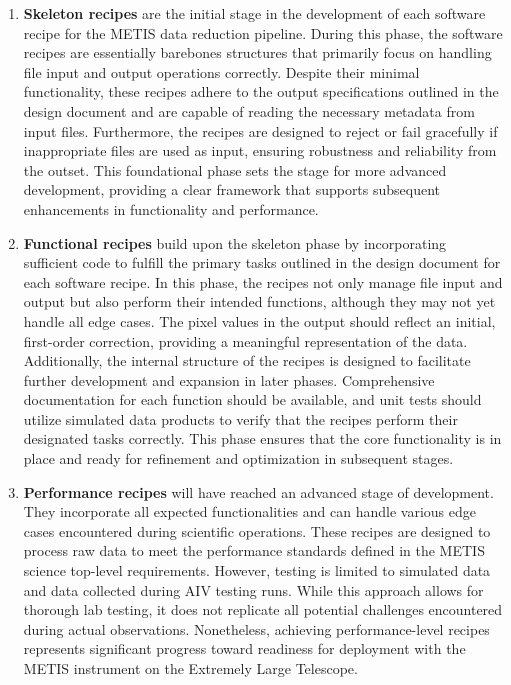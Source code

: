 \documentclass[a4paper]{spie}  %
\begin{document}
 \begin{enumerate}
     \item \textbf{Skeleton recipes }are the initial stage in the development of each software recipe for the METIS data reduction pipeline. During this phase, the software recipes are essentially barebones structures that primarily focus on handling file input and output operations correctly. Despite their minimal functionality, these recipes adhere to the output specifications outlined in the design document and are capable of reading the necessary metadata from input files. Furthermore, the recipes are designed to reject or fail gracefully if inappropriate files are used as input, ensuring robustness and reliability from the outset. This foundational phase sets the stage for more advanced development, providing a clear framework that supports subsequent enhancements in functionality and performance.
 
     \item \textbf{Functional recipes} build upon the skeleton phase by incorporating sufficient code to fulfill the primary tasks outlined in the design document for each software recipe. In this phase, the recipes not only manage file input and output but also perform their intended functions, although they may not yet handle all edge cases. The pixel values in the output should reflect an initial, first-order correction, providing a meaningful representation of the data. Additionally, the internal structure of the recipes is designed to facilitate further development and expansion in later phases. Comprehensive documentation for each function should be available, and unit tests should utilize simulated data products to verify that the recipes perform their designated tasks correctly. This phase ensures that the core functionality is in place and ready for refinement and optimization in subsequent stages. 

     \item \textbf{Performance recipes} will have reached an advanced stage of development. They incorporate all expected functionalities and can handle various edge cases encountered during scientific operations. These recipes are designed to process raw data to meet the performance standards defined in the METIS science top-level requirements. However, testing is limited to simulated data and data collected during AIV testing runs. While this approach allows for thorough lab testing, it does not replicate all potential challenges encountered during actual observations. Nonetheless, achieving performance-level recipes represents significant progress toward readiness for deployment with the METIS instrument on the Extremely Large Telescope. 


\end{enumerate}
\end{document}

